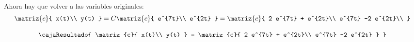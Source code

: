 Ahora hay que volver a las variables originales:
$$
  \matriz{c}{
    x(t)\\
    y(t)
  }
  =
  C
  \matriz{c}{
    e^{7t}\\
    e^{2t}
  }
  =
  \matriz{c}{
    2 e^{7t} +  e^{2t}\\
    e^{7t} -2  e^{2t}\\
  }
$$

$$
  \cajaResultado{
    \matriz{c}{
      x(t)\\
      y(t)
    }
    =
    \matriz{c}{
      2 e^{7t} +  e^{2t}\\
      e^{7t} -2  e^{2t}
    }
  }
$$

\begin{aportes}
  \item {}
\end{aportes}
